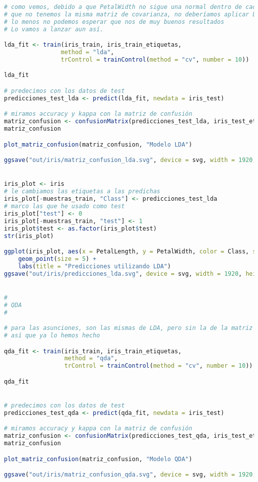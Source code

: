 \begin{lstlisting}[language=R]
# como vemos, debido a que PetalWidth no sigue una normal dentro de cada clase, y
# que no tenemos la misma matriz de covarianza, no deberíamos aplicar LDA, o por
# lo menos no podemos esperar que nos de muy buenos resultados
# Lo vamos a lanzar aun así.

lda_fit <- train(iris_train, iris_train_etiquetas,
				method = "lda",
				trControl = trainControl(method = "cv", number = 10))

lda_fit

# predecimos con los datos de test
predicciones_test_lda <- predict(lda_fit, newdata = iris_test)

# miramos accuracy y kappa con la matriz de confusión
matriz_confusion <- confusionMatrix(predicciones_test_lda, iris_test_etiquetas)
matriz_confusion

plot_matriz_confusion(matriz_confusion, "Modelo LDA")

ggsave("out/iris/matriz_confusion_lda.svg", device = svg, width = 1920, height = 1080, units = "px", dpi = 150)


iris_plot <- iris
# le cambiamos las etiquetas a las predichas
iris_plot[-muestras_train, "Class"] <- predicciones_test_lda
# marco las que he usado como test
iris_plot["test"] <- 0
iris_plot[-muestras_train, "test"] <- 1
iris_plot$test <- as.factor(iris_plot$test)
str(iris_plot)

ggplot(iris_plot, aes(x = PetalLength, y = PetalWidth, color = Class, shape = test)) +
	geom_point(size = 5) +
	labs(title = "Predicciones utilizando LDA")
ggsave("out/iris/predicciones_lda.svg", device = svg, width = 1920, height = 1080, units = "px", dpi = 150)


#
# QDA
#

# para las asunciones, son las mismas de LDA, pero sin la de la matriz de covarianza
# así que ya lo hemos hecho

qda_fit <- train(iris_train, iris_train_etiquetas,
				 method = "qda",
				 trControl = trainControl(method = "cv", number = 10))

qda_fit


# predecimos con los datos de test
predicciones_test_qda <- predict(qda_fit, newdata = iris_test)

# miramos accuracy y kappa con la matriz de confusión
matriz_confusion <- confusionMatrix(predicciones_test_qda, iris_test_etiquetas)
matriz_confusion

plot_matriz_confusion(matriz_confusion, "Modelo QDA")

ggsave("out/iris/matriz_confusion_qda.svg", device = svg, width = 1920, height = 1080, units = "px", dpi = 150)


\end{lstlisting}
